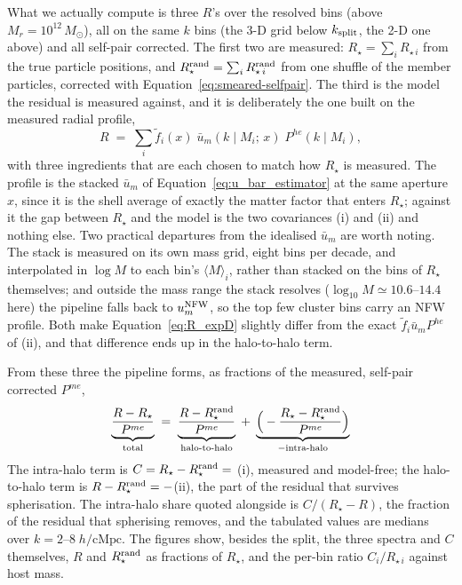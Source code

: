 \documentclass{article}
\begin{document}
What we actually compute is three $R$'s over
the resolved bins (above $M_r = 10^{12}\,M_\odot$), all on the same $k$ bins (the 3-D
grid below $k_{\rm split}$, the 2-D one above) and all self-pair corrected.
The first two are measured: $R_\star = \sum_i R_{\star\,i}$ from the true
particle positions, and $R_\star^{\rm rand} = \sum_i R_{\star\,i}^{\rm rand}$
from one shuffle of the member particles, corrected with
Equation~\eqref{eq:smeared-selfpair}. The third is the model the residual is
measured against, and it is deliberately the one built on the measured radial
profile,
\begin{equation}
  R \;=\; \sum_i \tilde f_i(x)\;\bar u_m(k\mid M_i;\,x)\;P^{he}(k\mid M_i),
  \label{eq:R_expD}
\end{equation}
with three ingredients that are each chosen to match how $R_\star$ is
measured. The profile is the
stacked $\bar u_m$ of Equation~\eqref{eq:u_bar_estimator} at the same
aperture $x$, since it is the shell average of exactly the matter factor that
enters $R_\star$; against it the gap between $R_\star$ and the model is the two
covariances (i) and (ii) and nothing else.  Two practical
departures from the idealised $\bar u_m$ are worth noting. The stack is
measured on its own mass grid, eight bins per decade, and interpolated in
$\log M$ to each bin's $\langle M\rangle_i$, rather than stacked on the bins of
$R_\star$ themselves; and outside the mass range the stack resolves
($\log_{10}M \simeq 10.6$--$14.4$ here) the pipeline falls back to $u_m^{\rm
NFW}$, so the top few cluster bins carry an NFW profile. Both make
Equation~\eqref{eq:R_expD} slightly differ from the exact $\tilde f_i\bar u_m
P^{he}$ of (ii), and that difference ends up in the halo-to-halo term.

From these three the pipeline forms, as fractions of the measured, self-pair
corrected $P^{me}$,
\begin{equation}
  \underbrace{\frac{R - R_\star}{P^{me}}}_{\text{total}}
  \;=\;
  \underbrace{\frac{R - R_\star^{\rm rand}}{P^{me}}}_{\text{halo-to-halo}}
  \;+\;
  \underbrace{\Big(-\frac{R_\star - R_\star^{\rm rand}}{P^{me}}\Big)}_{-\text{intra-halo}}
  \label{eq:expD_split}
\end{equation}
The intra-halo term is $C = R_\star - R_\star^{\rm
rand} = $ (i), measured and model-free; the halo-to-halo term is $R -
R_\star^{\rm rand} = -$(ii), the part of the residual that survives
spherisation. The intra-halo share quoted alongside is $C/(R_\star - R)$,
the fraction of the residual that spherising removes, and the tabulated values
are medians over $k = 2$--$8\;h/\mathrm{cMpc}$. The figures show, besides the
split, the three spectra and $C$ themselves, $R$ and $R_\star^{\rm rand}$ as
fractions of $R_\star$, and the per-bin ratio
$C_i/R_{\star\,i}$ against host mass.
\end{document}
